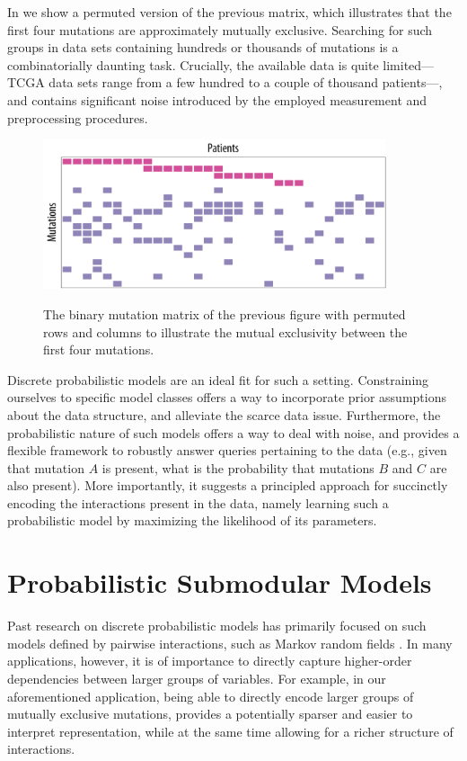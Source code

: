 In  we show a permuted version of the previous matrix, which illustrates that the first four mutations are approximately mutually exclusive.
Searching for such groups in data sets containing hundreds or thousands of mutations is a combinatorially daunting task.
Crucially, the available data is quite limited---TCGA data sets range from a few hundred to a couple of thousand patients---, and contains significant noise introduced by the employed measurement and preprocessing procedures.

\begin{figure}[htb]
\centering
\includegraphics[width=0.9\textwidth]{figures/intro/example1_rep.pdf}\\[1em]
\caption{The binary mutation matrix of the previous figure with permuted rows and columns to illustrate the mutual exclusivity between the first four mutations.}
\label{fig:bamat_2}
\end{figure}

Discrete probabilistic models are an ideal fit for such a setting.
Constraining ourselves to specific model classes offers a way to incorporate prior assumptions about the data structure, and alleviate the scarce data issue.
Furthermore, the probabilistic nature of such models offers a way to deal with noise, and provides a flexible framework to robustly answer queries pertaining to the data (e.g., given that mutation $A$ is present, what is the probability that mutations $B$ and $C$ are also present).
More importantly, it suggests a principled approach for succinctly encoding the interactions present in the data, namely learning such a probabilistic model by maximizing the likelihood of its parameters.

\section{Probabilistic Submodular Models}
Past research on discrete probabilistic models has primarily focused on such models defined by pairwise interactions, such as Markov random fields \cite{koller09}.
In many applications, however, it is of importance to directly capture higher-order dependencies between larger groups of variables.
For example, in our aforementioned application, being able to directly encode larger groups of mutually exclusive mutations, provides a potentially sparser and easier to interpret representation, while at the same time allowing for a richer structure of interactions.

